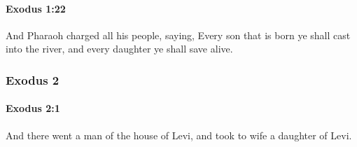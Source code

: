 		\paragraph{Exodus 1:22} %
			\label{EXODUS-1-22}

			And Pharaoh charged all his people, saying, Every son that is born ye shall cast into the river, and every daughter ye shall save alive.

	\subsubsection{Exodus 2} %
		\label{EXODUS-2}

		\paragraph{Exodus 2:1} %
			\label{EXODUS-2-1}

			And there went a man of the house of Levi, and took to wife a daughter of Levi.


